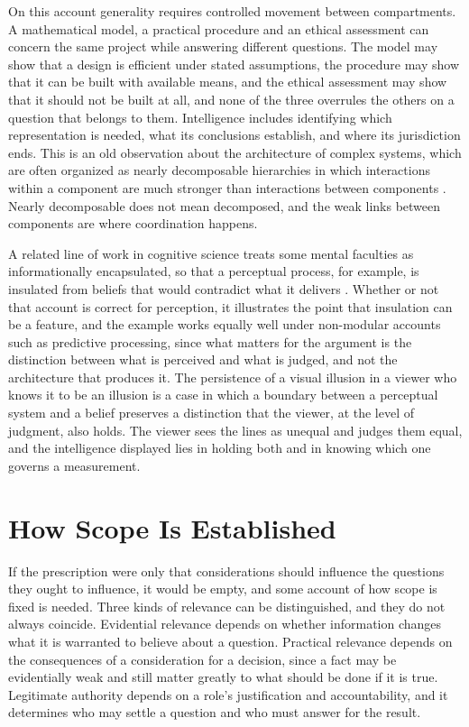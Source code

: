 \documentclass[12pt, a4paper]{article}
\begin{document}
On this account generality requires controlled movement between compartments. A mathematical model, a practical procedure and an ethical assessment can concern the same project while answering different questions. The model may show that a design is efficient under stated assumptions, the procedure may show that it can be built with available means, and the ethical assessment may show that it should not be built at all, and none of the three overrules the others on a question that belongs to them. Intelligence includes identifying which representation is needed, what its conclusions establish, and where its jurisdiction ends. This is an old observation about the architecture of complex systems, which are often organized as nearly decomposable hierarchies in which interactions within a component are much stronger than interactions between components \citep{simon1962}. Nearly decomposable does not mean decomposed, and the weak links between components are where coordination happens.

A related line of work in cognitive science treats some mental faculties as informationally encapsulated, so that a perceptual process, for example, is insulated from beliefs that would contradict what it delivers \citep{fodor1983}. Whether or not that account is correct for perception, it illustrates the point that insulation can be a feature, and the example works equally well under non-modular accounts such as predictive processing, since what matters for the argument is the distinction between what is perceived and what is judged, and not the architecture that produces it. The persistence of a visual illusion in a viewer who knows it to be an illusion is a case in which a boundary between a perceptual system and a belief preserves a distinction that the viewer, at the level of judgment, also holds. The viewer sees the lines as unequal and judges them equal, and the intelligence displayed lies in holding both and in knowing which one governs a measurement.

\section{How Scope Is Established}

If the prescription were only that considerations should influence the questions they ought to influence, it would be empty, and some account of how scope is fixed is needed. Three kinds of relevance can be distinguished, and they do not always coincide. Evidential relevance depends on whether information changes what it is warranted to believe about a question. Practical relevance depends on the consequences of a consideration for a decision, since a fact may be evidentially weak and still matter greatly to what should be done if it is true. Legitimate authority depends on a role's justification and accountability, and it determines who may settle a question and who must answer for the result.
\end{document}
